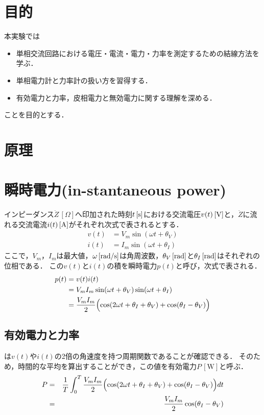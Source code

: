 \documentclass[11pt,dvipdfmx]{ujarticle}
\begin{document}
\begin{jikkenTitle}
 \subTitle{} 
 \kyoudouII{}
 \end{jikkenTitle}

\section{目的}
本実験では
\begin{itemize}
	\item 単相交流回路における電圧・電流・電力・力率を測定するための結線方法を学ぶ．
	\item 単相電力計と力率計の扱い方を習得する．
	\item 有効電力と力率，皮相電力と無効電力に関する理解を深める．
\end{itemize}
ことを目的とする．

\section{原理}
\section{瞬時電力(in-stantaneous power)\cite{11300007922816}\cite{1130282271973066112}}
インピーダンス$\dot{Z}\,[\Omega]$へ印加された時刻$t\,[\rm{s}]$における交流電圧$v(t)\,[\rm{V}]$と，$\dot{Z}$に流れる交流電流$i(t)\,[\rm{A}]$がそれぞれ次式で表されるとする．
\begin{align}
	v(t) &= V_m\sin(\omega t+\theta_V)\\
	i(t) &= I_m\sin(\omega t + \theta_I)
\end{align}
ここで，$V_m$，$I_m$は最大値，$\omega\,[\rm{rad/s}]$は角周波数，$\theta_V\,[\rm{rad}]$と$\theta_I\,[\rm{rad}]$はそれぞれの位相である．
この$v(t)$と$i(t)$の積を瞬時電力$p(t)$と呼び，次式で表される．
\begin{align}
	p(t)&= v(t)i(t)\nonumber\\
	&=V_mI_m\sin(\omega t+\theta_V)\sin(\omega t + \theta_I)\nonumber\\
	&= \frac{V_mI_m}{2}\Bigl(\cos(2\omega t + \theta_I+\theta_V)+\cos(\theta_I - \theta_V)\Bigr)
	\label{eq:ip}
\end{align}



\subsection{有効電力と力率}
は$v(t)$や$i(t)$の2倍の角速度を持つ周期関数であることが確認できる．
そのため，時間的な平均を算出することができ，この値を有効電力$P\,[\mathrm{W}]$と呼ぶ．
\begin{eqnarray}
	P &=& \frac{1}{T}\int_0^T \frac{V_mI_m}{2}\Bigl(\cos(2\omega t + \theta_I+\theta_V)+\cos(\theta_I - \theta_V)\Bigr) dt\nonumber\\
	&=&\frac{V_mI_m}{2}\cos(\theta_I - \theta_V)
\end{eqnarray}
\end{document}
